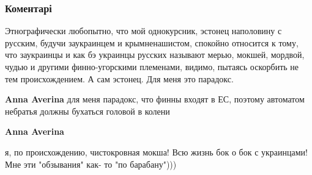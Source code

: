  
 
 
 
 
\subsubsection{Коментарі}
\label{sec:07_12_2020.fb.tukmakov_denis.rossia.filosof.1.bitva_borsch.cmt}

\begin{itemize}
 
Этнографически любопытно, что мой однокурсник, эстонец наполовину с русским,
будучи заукраинцем и крымненашистом, спокойно относится к тому, что заукраинцы
и как бэ украинцы русских называют мерью, мокшей, мордвой, чудью и другими
финно-угорскими племенами, видимо, пытаясь оскорбить не тем происхождением. А
сам эстонец. Для меня это парадокс.



\begin{itemize}
 
\textbf{Anna Averina} для меня парадокс, что финны входят в ЕС, поэтому автоматом небратья должны бухаться головой в колени

 
\textbf{Anna Averina} 

я, по происхождению, чистокровная мокша! Всю жизнь бок о бок с украинцами! Мне
эти "обзывания" как- то "по барабану")))

 

\end{itemize}
\end{itemize}
